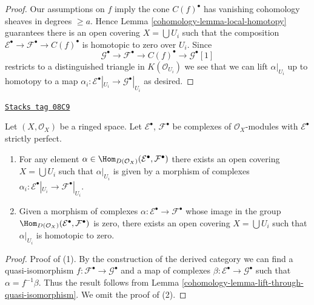 \begin{proof}

Our assumptions on $f$ imply the cone $C(f)^\bullet$ has vanishing
cohomology sheaves in degrees $\geq a$.
Hence Lemma \ref{cohomology-lemma-local-homotopy} guarantees there is an open
covering $X = \bigcup U_i$ such that the composition
$\mathcal{E}^\bullet \to \mathcal{F}^\bullet \to C(f)^\bullet$
is homotopic to zero over $U_i$. Since
$$
\mathcal{G}^\bullet \to \mathcal{F}^\bullet \to C(f)^\bullet \to
\mathcal{G}^\bullet[1]
$$
restricts to a distinguished triangle in $K(\mathcal{O}_{U_i})$
we see that we can lift $\alpha|_{U_i}$ up to homotopy to a map
$\alpha_i : \mathcal{E}^\bullet|_{U_i} \to \mathcal{G}^\bullet|_{U_i}$
as desired.
\end{proof}

\begin{lemma}
\label{cohomology-lemma-local-actual}
\href{https://stacks.math.columbia.edu/tag/08C9}{\texttt{Stacks tag 08C9}}

Let $(X, \mathcal{O}_X)$ be a ringed space.
Let $\mathcal{E}^\bullet$, $\mathcal{F}^\bullet$ be complexes
of $\mathcal{O}_X$-modules with $\mathcal{E}^\bullet$ strictly perfect.
\begin{enumerate}
\item For any element
$\alpha \in \Hom_{D(\mathcal{O}_X)}(\mathcal{E}^\bullet, \mathcal{F}^\bullet)$
there exists an open covering $X = \bigcup U_i$ such that
$\alpha|_{U_i}$ is given by a morphism of complexes
$\alpha_i : \mathcal{E}^\bullet|_{U_i} \to \mathcal{F}^\bullet|_{U_i}$.
\item Given a morphism of complexes
$\alpha : \mathcal{E}^\bullet \to \mathcal{F}^\bullet$
whose image in the group
$\Hom_{D(\mathcal{O}_X)}(\mathcal{E}^\bullet, \mathcal{F}^\bullet)$
is zero, there exists an open covering $X = \bigcup U_i$ such that
$\alpha|_{U_i}$ is homotopic to zero.
\end{enumerate}
\end{lemma}

\begin{proof}

Proof of (1).
By the construction of the derived category we can find a quasi-isomorphism
$f : \mathcal{F}^\bullet \to \mathcal{G}^\bullet$ and a map of complexes
$\beta : \mathcal{E}^\bullet \to \mathcal{G}^\bullet$ such that
$\alpha = f^{-1}\beta$. Thus the result follows from
Lemma \ref{cohomology-lemma-lift-through-quasi-isomorphism}.
We omit the proof of (2).
\end{proof}

